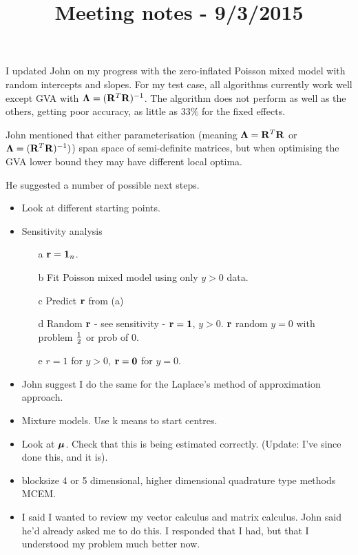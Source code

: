 \documentclass{article}[12pt]
\title{Meeting notes - 9/3/2015}
\begin{document}
\maketitle

I updated John on my progress with the zero-inflated Poisson mixed model with random
intercepts and slopes. For my test case, all algorithms currently work well except GVA with
${\boldsymbol \Lambda} = ({\bf R}^T{\bf R})^{-1}$. The algorithm does not perform as well as the others, getting
poor accuracy, as little as $33\%$ for the fixed effects.

John mentioned that either parameterisation (meaning ${\boldsymbol \Lambda}={\bf R}^T {\bf R}$ or 
${\boldsymbol \Lambda}=({\bf R}^T {\bf R})^{-1})$) span space of semi-definite matrices, but when optimising the 
GVA lower bound they may have different local optima.

He suggested a number of possible next steps.

\begin{itemize}
\item Look at different starting points.

\item Sensitivity analysis
\begin{enumerate}
\item[a] ${\bf r} = {\bf 1}_n$.
\item[b] Fit Poisson mixed model using only $y > 0$ data.
\item[c] Predict ${\bf r}$ from (a)
\item[d] Random ${\bf r}$ - see sensitivity - ${\bf r} = {\bf 1}$, $y > 0$.
${\bf r}$ random $y=0$ with problem $\tfrac{1}{2}$ or prob of $0$.
\item[e] $r=1$ for $y > 0$, ${\bf r}={\bf 0}$ for $y=0$.
\end{enumerate}

\item John suggest I do the same for the Laplace's method of approximation approach.

\item Mixture models. Use k means to start centres.

\item Look at ${\boldsymbol \mu}$. Check that this is being estimated correctly. (Update: I've since
done this, and it is).

\item blocksize 4 or 5 dimensional, higher dimensional quadrature type methods
MCEM.

\item I said I wanted to review my vector calculus and matrix calculus. John said he'd
already asked me to do this. I responded that I had, but that I understood my problem
much better now.
\end{itemize}
\end{document}

